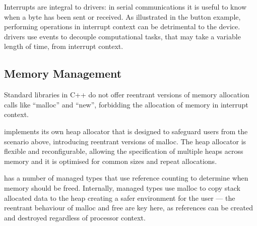 Interrupts are integral to drivers: in serial communications it is useful to know when a byte has been sent or received. As illustrated in the button example, performing operations in interrupt context can be detrimental to the device. \CO drivers use events to decouple computational tasks, that may take a variable length of time, from interrupt context.


\subsection{Memory Management}

Standard libraries in C++ do not offer reentrant versions of memory allocation calls like ``malloc'' and ``new'', forbidding the allocation of memory in interrupt context.

\CO implements its own heap allocator that is designed to safeguard users from the scenario above, introducing reentrant versions of malloc. The heap allocator is flexible and reconfigurable, allowing the specification of multiple heaps across memory and it is optimised for common sizes and repeat allocations.

\CO has a number of managed types that use reference counting to determine when memory should be freed. Internally, managed types use malloc to copy stack allocated data to the heap creating a safer environment for the user --- the reentrant behaviour of malloc and free are key here, as references can be created and destroyed regardless of processor context.



